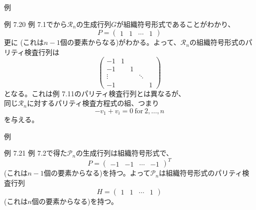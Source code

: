 \documentclass[dvipdfmx,10pt,jsarticle]{beamer}
\begin{document}
  \begin{frame}{例}
    \begin{block}{例 7.20}
      例 7.1でから$\mathcal{R}_n$の生成行列$G$が組織符号形式であることがわかり、
      \[ P = \begin{pmatrix}
          1 & 1 & \cdots & 1
      \end{pmatrix} \]
      更に (これは$n - 1$個の要素からなる)がわかる。よって、$\mathcal{R}_n$の組織符号形式のパリティ検査行列は
      \[ \begin{pmatrix}
          -1 & 1  \\
          -1 &   & 1 \\
          \vdots &   &   & \ddots \\
          -1 &  &  &   & 1
      \end{pmatrix}  \]
      となる。これは例 7.11のパリティ検査行列とは異なるが、 \\
      同じ$\mathcal{R}_n$に対するパリティ検査方程式の組、つまり
      \[-v_1 + v_i = 0 \ \text{for} \ 2, \ldots, n\]
      を与える。
    \end{block}
  \end{frame}

  \begin{frame}{例}
    \begin{block}{例 7.21}
      例 7.2で得た$\mathcal{P}_n$の生成行列は組織符号形式で、
      \[ P = \begin{pmatrix}
          -1 & -1 & \cdots & -1
      \end{pmatrix}^T \]
      (これは$n - 1$個の要素からなる)を持つ。よって$\mathcal{P}_n$は組織符号形式のパリティ検査行列
      \[ H = \begin{pmatrix}
          1 & 1 & \cdots & 1
      \end{pmatrix} \]
      (これは$n$個の要素からなる)を持つ。
    \end{block}
  \end{frame}
\end{document}
